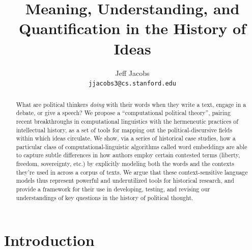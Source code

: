 \documentclass[11pt]{article}
\title{Meaning, Understanding, and Quantification in the History of Ideas}
\author{Jeff Jacobs\\\texttt{jjacobs3@cs.stanford.edu}}
\begin{document}
	
	\maketitle
	
\begin{abstract}
\noindent What are political thinkers \textit{doing} with their words when they write a text, engage in a debate, or give a speech? We propose a ``computational political theory'', pairing recent breakthroughs in computational linguistics with the hermeneutic practices of intellectual history, as a set of tools for mapping out the political-discursive fields within which ideas circulate. We show, via a series of historical case studies, how a particular class of computational-linguistic algorithms called word embeddings are able to capture subtle differences in how authors employ certain contested terms (liberty, freedom, sovereignty, etc.) by explicitly modeling both the words and the contexts they're used in across a corpus of texts. We argue that these context-sensitive language models thus represent powerful and underutilized tools for historical research, and provide a framework for their use in developing, testing, and revising our understandings of key questions in the history of political thought.
\end{abstract}

\doublespacing

%
%
%	
	

\tableofcontents

\section{Introduction}\label{sec:intro}
\end{document}
